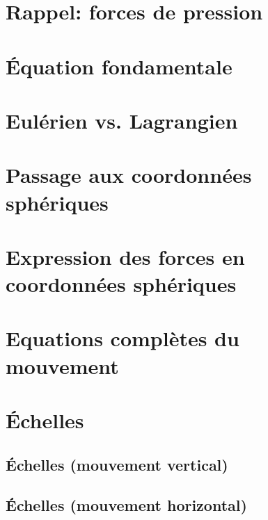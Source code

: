 \documentclass[a4paper,DIV16,10pt]{scrartcl}
\begin{document}
 \inidoc

\mk \section{Rappel: forces de pression}


\mk \section{\'Equation fondamentale}


\mk \section{Eulérien vs. Lagrangien}


\mk \section{Passage aux coordonnées sphériques}


\mk \section{Expression des forces en coordonnées sphériques}


\mk \section{Equations complètes du mouvement}


\mk \section{\'Echelles}


	\mk \subsection{\'Echelles (mouvement vertical)}
	

	\mk \subsection{\'Echelles (mouvement horizontal)}
	
\end{document}
